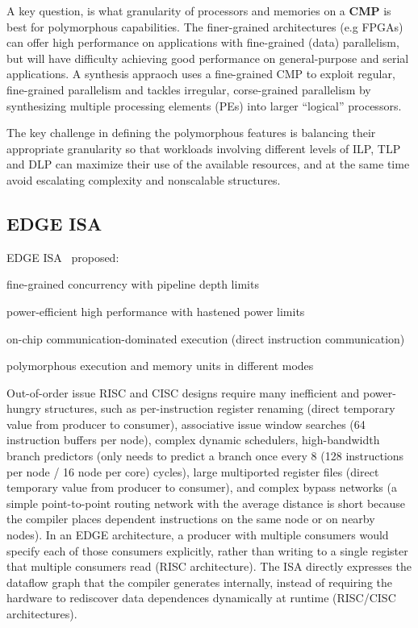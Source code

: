 \documentclass[UTF8,12pt,a4paper]{article}
\begin{document}
A key question, is what granularity of processors and memories
on a \textbf{CMP} is best for polymorphous capabilities.
The finer-grained architectures (e.g FPGAs) can offer high performance
on applications with fine-grained (data) parallelism,
but will have difficulty achieving good performance on general-purpose and serial applications.
A synthesis appraoch uses a fine-grained CMP to exploit regular, fine-grained parallelism
and tackles irregular, corse-grained parallelism by
synthesizing multiple processing elements (PEs) into larger ``logical'' processors.

The key challenge in defining the polymorphous features
is balancing their appropriate granularity so that
workloads involving different levels of ILP, TLP and DLP
can maximize their use of the available resources,
and at the same time avoid escalating complexity and nonscalable structures.

\subsection{EDGE ISA}

EDGE ISA~\cite{DBLP:journals/computer/BurgerKMDJLMBMY04} proposed:

\begin{compactitem}
  \item fine-grained concurrency with pipeline depth limits
  \item power-efficient high performance with hastened power limits
  \item on-chip communication-dominated execution (direct instruction communication)
  \item polymorphous execution and memory units in different modes
\end{compactitem}

Out-of-order issue RISC and CISC designs require many inefficient and power-hungry structures,
such as per-instruction register renaming (direct temporary value from producer to consumer),
associative issue window searches (64 instruction buffers per node),
complex dynamic schedulers,
high-bandwidth branch predictors (only needs to predict a branch once every 8 (128 instructions per node / 16 node per core) cycles),
large multiported register files (direct temporary value from producer to consumer),
and complex bypass networks (a simple point-to-point routing network with the average distance is short
because the compiler places dependent instructions on the same node or on nearby nodes).
In an EDGE architecture, a producer with multiple consumers would specify each of those consumers explicitly,
rather than writing to a single register that multiple consumers read (RISC architecture).
The ISA directly expresses the dataflow graph that the compiler generates internally,
instead of requiring the hardware to rediscover data dependences dynamically at runtime (RISC/CISC architectures).
\end{document}
